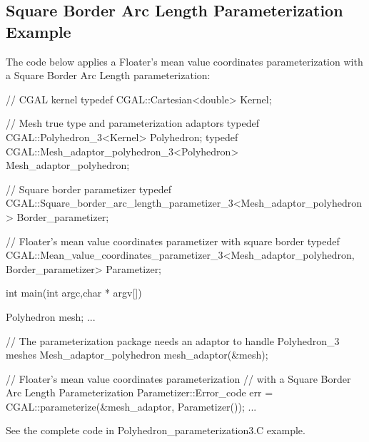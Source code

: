 \subsection{Square Border Arc Length Parameterization Example}

The code below applies a Floater's mean value coordinates parameterization
with a Square Border Arc Length parameterization:

\begin{ccExampleCode}

// CGAL kernel
typedef CGAL::Cartesian<double>                         Kernel;

// Mesh true type and parameterization adaptors
typedef CGAL::Polyhedron_3<Kernel>                      Polyhedron;
typedef CGAL::Mesh_adaptor_polyhedron_3<Polyhedron>     Mesh_adaptor_polyhedron;

// Square border parametizer
typedef CGAL::Square_border_arc_length_parametizer_3<Mesh_adaptor_polyhedron>
                                                      Border_parametizer;

// Floater's mean value coordinates parametizer with square border
typedef CGAL::Mean_value_coordinates_parametizer_3<Mesh_adaptor_polyhedron,
                                                    Border_parametizer>
                                                        Parametizer;

int main(int argc,char * argv[])
{
    Polyhedron mesh;
    ...

    // The parameterization package needs an adaptor to handle Polyhedron_3 meshes
    Mesh_adaptor_polyhedron mesh_adaptor(&mesh);

    // Floater's mean value coordinates parameterization
    // with a Square Border Arc Length Parameterization
    Parametizer::Error_code err = CGAL::parameterize(&mesh_adaptor, Parametizer());
    ...
}

\end{ccExampleCode}

See the complete code in Polyhedron\_parameterization3.C example.
